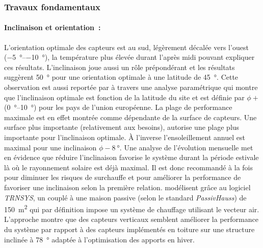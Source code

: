 \subsubsection{Travaux fondamentaux} %
\label{ssub:travaux_fondamentaux}
\paragraph{Inclinaison et orientation~:} %
\label{par:inclinaison_et_orientation}
L’orientation optimale des capteurs est au sud, légèrement décalée vers
l’ouest (\SIrange{-5}{-10}{\degree}), la température plus élevée durant l’après midi pouvant
expliquer ces résultats.
L’inclinaison joue aussi un rôle prépondérant et les résultats suggèrent \SI{50}{\degree}
pour une orientation optimale à une latitude de \SI{45}{\degree}. Cette observation est
aussi reportée par \textcite{Shariah2002587} à travers une analyse paramétrique qui montre
que l’inclinaison optimale est fonction de la latitude du site et est définie par
$\phi + $(\SIrange{0}{10}{\degree}) pour les pays de l’union européenne. La plage de performance
maximale est en effet montrée comme dépendante de la surface de capteurs.
Une surface plus importante (relativement aux besoins), autorise une plage plus importante
pour l’inclinaison optimale. À l’inverse l’ensoleillement annuel est maximal pour
une inclinaison $\phi - \SI{8}{\degree}$. Une analyse de l’évolution mensuelle met
en évidence que réduire l’inclinaison favorise le système durant la période estivale
là où le rayonnement solaire est déjà maximal. Il est donc recommandé à la fois pour diminuer
les risques de surchauffe et pour améliorer la performance de favoriser une
inclinaison selon la première relation.
\textcite{Badescu2006129} modélisent grâce au logiciel \textit{TRNSYS}, un 
couplé à une maison passive (selon le standard \textit{PassivHauss}) de \SI{150}{\metre\squared}
qui par définition impose un système de chauffage utilisant le vecteur air. L’approche montre que des
capteurs verticaux semblent améliorer la performance du système par rapport à des
capteurs implémentés en toiture sur une structure inclinée à \SI{78}{\degree} adaptée à l’optimisation
des apports en hiver.

